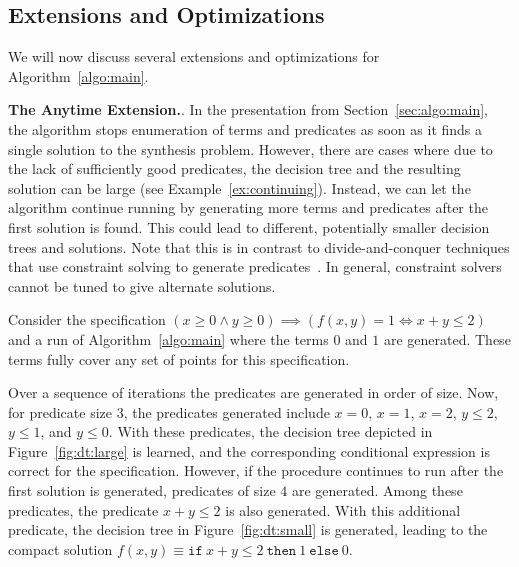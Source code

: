 \documentclass{llncs}
\newcommand\SynthFun{f}
\renewcommand{\paragraph}[1]{\par\noindent\textbf{#1}.}
\begin{document}
\subsection{Extensions and Optimizations}
\label{sec:optimizations}

We will now discuss several extensions and optimizations for
Algorithm~\ref{algo:main}.


\paragraph{The Anytime Extension.}
In the presentation from Section~\ref{sec:algo:main}, the algorithm
stops enumeration of terms and predicates as soon as it finds a single
solution to the synthesis problem.
However, there are cases where due to the lack of sufficiently good
predicates, the decision tree and the resulting solution can be large
(see Example~\ref{ex:continuing}).
Instead, we can let the algorithm continue running by generating more
terms and predicates after the first solution is found.
This could lead to different, potentially smaller decision trees and
solutions.
Note that this is in contrast to divide-and-conquer techniques that use
constraint solving to generate predicates~\cite{alur-15,madhusudan-16-pw}.
In general, constraint solvers cannot be tuned to give alternate
solutions.

\begin{example}
  \label{ex:continuing}
  Consider the specification $(x \geq 0 \wedge y \geq 0) \implies (\SynthFun(x, y) = 1
  \Leftrightarrow x + y \leq 2)$ and a run of Algorithm~\ref{algo:main}
  where the terms $0$ and $1$ are generated.
  These terms fully cover any set of points for this specification.

  Over a sequence of iterations the predicates are generated in order of
  size.
  Now, for predicate size $3$, the predicates generated include $x = 0$,
  $x = 1$, $x = 2$, $y \leq 2$, $y \leq 1$, and $y \leq 0$.
  With these predicates, the decision tree depicted in
  Figure~\ref{fig:dt:large} is learned, and the corresponding
  conditional expression is correct for the specification.
  However, if the procedure continues to run after the first solution is
  generated, predicates of size $4$ are generated.
  Among these predicates, the predicate $x + y \leq 2$ is also
  generated.
  With this additional predicate, the decision tree in
  Figure~\ref{fig:dt:small} is generated, leading to the compact
  solution $\SynthFun(x, y) \equiv \mathtt{if}~x + y \leq
  2~\mathtt{then}~1~\mathtt{else}~0$.
\end{example}
\end{document}
